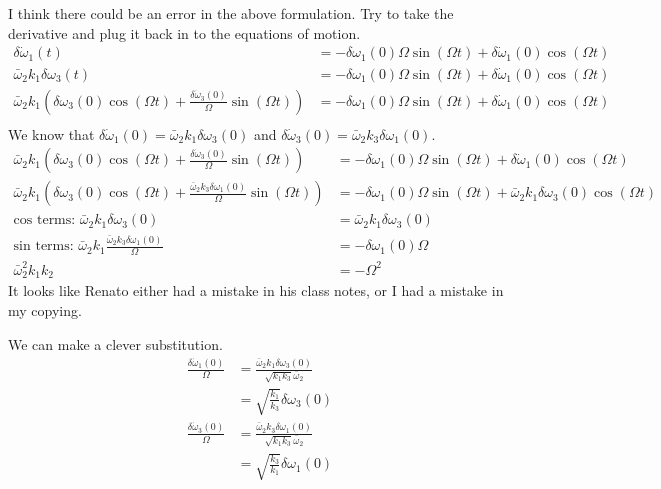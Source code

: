 \documentclass[]{article}
\begin{document}
I think there could be an error in the above formulation. Try to take the derivative and plug it back in to the equations of motion.
\begin{align}
	\delta \dot{\omega}_1(t) & = - \delta \omega_1(0) \Omega \sin(\Omega t) +  \delta \dot{\omega}_1 (0) \cos(\Omega t) \\
	\bar{\omega}_2 k_1 \delta \omega_3 (t) & = - \delta \omega_1(0) \Omega \sin(\Omega t) + \delta \dot{\omega}_1 (0) \cos(\Omega t) \\
	\bar{\omega}_2 k_1 \left( \delta \omega_3(0) \cos(\Omega t) + \frac{\delta \dot{\omega}_3 (0)}{\Omega} \sin(\Omega t) \right) & = - \delta \omega_1(0) \Omega \sin(\Omega t) +  \delta \dot{\omega}_1 (0) \cos(\Omega t) \\
\end{align}
We know that $\delta \dot{\omega}_1(0) = \bar{\omega}_2 k_1 \delta \omega_3(0)$ and $\delta \dot{\omega}_3(0) = \bar{\omega}_2 k_3 \delta \omega_1(0)$.
\begin{align}
	\bar{\omega}_2 k_1 \left( \delta \omega_3(0) \cos(\Omega t) + \frac{\delta \dot{\omega}_3 (0)}{\Omega} \sin(\Omega t) \right) & = - \delta \omega_1(0) \Omega \sin(\Omega t) +  \delta \dot{\omega}_1 (0) \cos(\Omega t) \\
	\bar{\omega}_2 k_1 \left( \delta \omega_3(0) \cos(\Omega t) + \frac{\bar{\omega}_2 k_3 \delta \omega_1(0)}{\Omega} \sin(\Omega t) \right) & = - \delta \omega_1(0) \Omega \sin(\Omega t) +  \bar{\omega}_2 k_1 \delta \omega_3(0) \cos(\Omega t) \\
	\text{cos terms: } \bar{\omega}_2 k_1 \delta \omega_3(0) & = \bar{\omega}_2 k_1 \delta \omega_3(0) \\
	\text{sin terms: } \bar{\omega}_2 k_1 \frac{\bar{\omega}_2 k_3 \delta \omega_1(0)}{\Omega} & = - \delta \omega_1(0) \Omega \\
	\bar{\omega}_2^2 k_1 k_2 & = -\Omega^2
\end{align}
It looks like Renato either had a mistake in his class notes, or I had a mistake in my copying.

We can make a clever substitution.
\begin{align}
	\frac{\delta \dot{\omega}_1 (0)}{\Omega} & = \frac{\bar{\omega}_2 k_1 \delta \omega_3(0)}{\sqrt{k_1 k_3} \bar{\omega}_2} \\
	& = \sqrt{\frac{k_1}{k_3}}\delta \omega_3(0) \\
	\frac{\delta \dot{\omega}_3 (0)}{\Omega} & = \frac{\bar{\omega}_2 k_3 \delta \omega_1(0)}{\sqrt{k_1 k_3} \bar{\omega}_2} \\
	& = \sqrt{\frac{k_3}{k_1}}\delta \omega_1(0)
\end{align}
\end{document}

